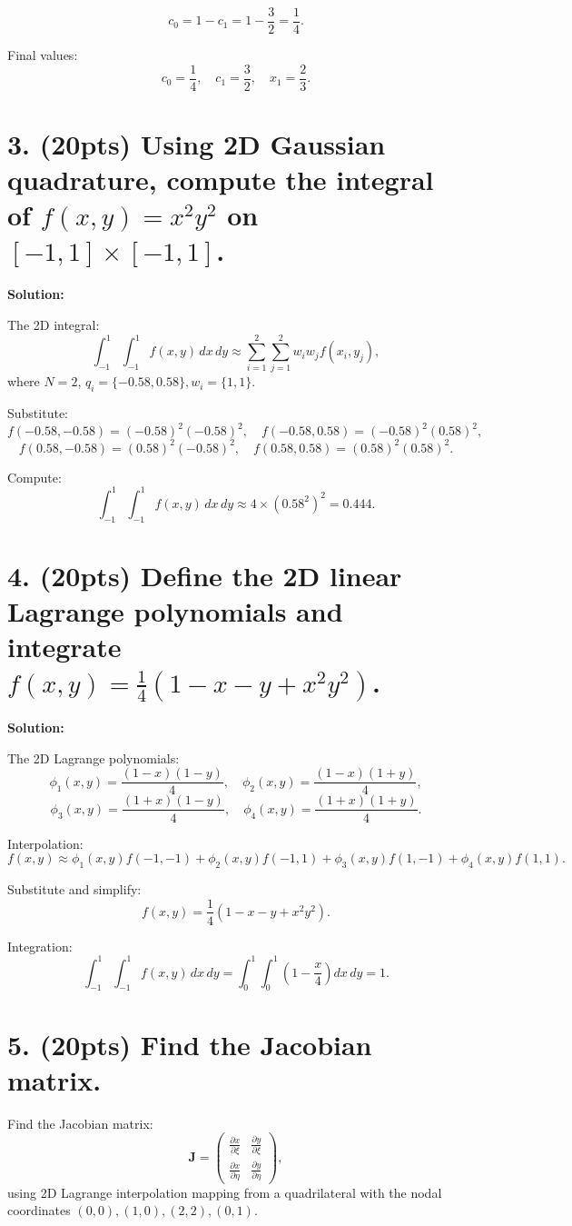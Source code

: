 \documentclass[11pt]{article}
\begin{document}
\[
c_0 = 1 - c_1 = 1 - \frac{3}{2} = \frac{1}{4}.
\]

Final values:
\[
c_0 = \frac{1}{4}, \quad c_1 = \frac{3}{2}, \quad x_1 = \frac{2}{3}.
\]

\section*{3. (20pts) Using 2D Gaussian quadrature, compute the integral of $f(x, y) = x^2y^2$ on $[-1, 1] \times [-1, 1]$.}

\textbf{Solution:}

The 2D integral:
\[
\int_{-1}^1 \int_{-1}^1 f(x, y) \, dx \, dy \approx \sum_{i=1}^2 \sum_{j=1}^2 w_i w_j f(x_i, y_j),
\]
where \(N = 2\), \(q_i = \{-0.58, 0.58\}, w_i = \{1, 1\}\).

Substitute:
\[
f(-0.58, -0.58) = (-0.58)^2(-0.58)^2, \quad f(-0.58, 0.58) = (-0.58)^2(0.58)^2,
\]
\[
f(0.58, -0.58) = (0.58)^2(-0.58)^2, \quad f(0.58, 0.58) = (0.58)^2(0.58)^2.
\]

Compute:
\[
\int_{-1}^1 \int_{-1}^1 f(x, y) \, dx \, dy \approx 4 \times (0.58^2)^2 = 0.444.
\]

\section*{4. (20pts) Define the 2D linear Lagrange polynomials and integrate $f(x, y) = \frac{1}{4}(1 - x - y + x^2 y^2)$.}

\textbf{Solution:}

The 2D Lagrange polynomials:
\[
\phi_1(x, y) = \frac{(1-x)(1-y)}{4}, \quad \phi_2(x, y) = \frac{(1-x)(1+y)}{4},
\]
\[
\phi_3(x, y) = \frac{(1+x)(1-y)}{4}, \quad \phi_4(x, y) = \frac{(1+x)(1+y)}{4}.
\]

Interpolation:
\[
f(x, y) \approx \phi_1(x, y) f(-1, -1) + \phi_2(x, y) f(-1, 1) + \phi_3(x, y) f(1, -1) + \phi_4(x, y) f(1, 1).
\]

Substitute and simplify:
\[
f(x, y) = \frac{1}{4}(1 - x - y + x^2 y^2).
\]

Integration:
\[
\int_{-1}^1 \int_{-1}^1 f(x, y) \, dx \, dy = \int_0^1 \int_0^1 \left(1 - \frac{x}{4}\right) dx \, dy = 1.
\]

\section*{5. (20pts) Find the Jacobian matrix.}

Find the Jacobian matrix:
\[
\mathbf{J} =
\begin{pmatrix}
\frac{\partial x}{\partial \xi} & \frac{\partial y}{\partial \xi} \\
\frac{\partial x}{\partial \eta} & \frac{\partial y}{\partial \eta}
\end{pmatrix},
\]
using 2D Lagrange interpolation mapping from a quadrilateral with the nodal coordinates \((0,0), (1,0), (2,2), (0,1)\).
\end{document}
